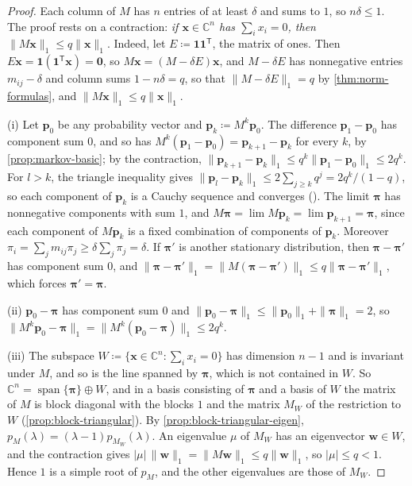 \begin{proof}
Each column of $M$ has $n$ entries of at least $\delta$ and sums to $1$, so $n\delta\le1$. The proof rests on a contraction: \emph{if $\mathbf x\in\mathbb C^n$ has $\sum_ix_i=0$, then $\|M\mathbf x\|_1\le q\|\mathbf x\|_1$}. Indeed, let $E\coloneqq\mathbf 1\mathbf 1^{\mathsf T}$, the matrix of ones. Then $E\mathbf x=\mathbf 1(\mathbf 1^{\mathsf T}\mathbf x)=\mathbf 0$, so $M\mathbf x=(M-\delta E)\mathbf x$, and $M-\delta E$ has nonnegative entries $m_{ij}-\delta$ and column sums $1-n\delta=q$, so that $\|M-\delta E\|_1=q$ by \cref{thm:norm-formulas}, and $\|M\mathbf x\|_1\le q\|\mathbf x\|_1$.

(i) Let $\mathbf p_0$ be any probability vector and $\mathbf p_k\coloneqq M^k\mathbf p_0$. The difference $\mathbf p_1-\mathbf p_0$ has component sum $0$, and so has $M^k(\mathbf p_1-\mathbf p_0)=\mathbf p_{k+1}-\mathbf p_k$ for every $k$, by \cref{prop:markov-basic}; by the contraction, $\|\mathbf p_{k+1}-\mathbf p_k\|_1\le q^k\|\mathbf p_1-\mathbf p_0\|_1\le2q^k$. For $l>k$, the triangle inequality gives $\|\mathbf p_l-\mathbf p_k\|_1\le2\sum_{j\ge k}q^j=2q^k/(1-q)$, so each component of $\mathbf p_k$ is a Cauchy sequence and converges (). The limit $\boldsymbol\pi$ has nonnegative components with sum $1$, and $M\boldsymbol\pi=\lim M\mathbf p_k=\lim\mathbf p_{k+1}=\boldsymbol\pi$, since each component of $M\mathbf p_k$ is a fixed combination of components of $\mathbf p_k$. Moreover $\pi_i=\sum_jm_{ij}\pi_j\ge\delta\sum_j\pi_j=\delta$. If $\boldsymbol\pi'$ is another stationary distribution, then $\boldsymbol\pi-\boldsymbol\pi'$ has component sum $0$, and $\|\boldsymbol\pi-\boldsymbol\pi'\|_1=\|M(\boldsymbol\pi-\boldsymbol\pi')\|_1\le q\|\boldsymbol\pi-\boldsymbol\pi'\|_1$, which forces $\boldsymbol\pi'=\boldsymbol\pi$.

(ii) $\mathbf p_0-\boldsymbol\pi$ has component sum $0$ and $\|\mathbf p_0-\boldsymbol\pi\|_1\le\|\mathbf p_0\|_1+\|\boldsymbol\pi\|_1=2$, so $\|M^k\mathbf p_0-\boldsymbol\pi\|_1=\|M^k(\mathbf p_0-\boldsymbol\pi)\|_1\le2q^k$.

(iii) The subspace $W\coloneqq\{\mathbf x\in\mathbb C^n:\sum_ix_i=0\}$ has dimension $n-1$ and is invariant under $M$, and so is the line spanned by $\boldsymbol\pi$, which is not contained in $W$. So $\mathbb C^n=\operatorname{span}\{\boldsymbol\pi\}\oplus W$, and in a basis consisting of $\boldsymbol\pi$ and a basis of $W$ the matrix of $M$ is block diagonal with the blocks $1$ and the matrix $M_W$ of the restriction to $W$ (\cref{prop:block-triangular}). By \cref{prop:block-triangular-eigen}, $p_M(\lambda)=(\lambda-1)p_{M_W}(\lambda)$. An eigenvalue $\mu$ of $M_W$ has an eigenvector $\mathbf w\in W$, and the contraction gives $|\mu|\,\|\mathbf w\|_1=\|M\mathbf w\|_1\le q\|\mathbf w\|_1$, so $|\mu|\le q<1$. Hence $1$ is a simple root of $p_M$, and the other eigenvalues are those of $M_W$.
\end{proof}

